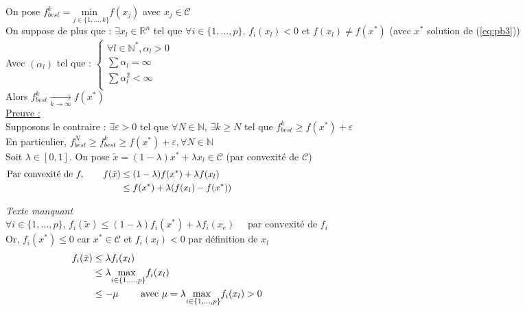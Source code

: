 \documentclass[12pt,a4paper]{article}
\begin{document}
On pose $f^k_{best} = \underset{j \in \{1, \dots, k\}}{\text{min }} f(x_j)$ avec $x_j \in \mathcal{C}$\\

On suppose de plus que : $\exists x_l \in \mathbb{R}^n$ tel que $\forall i \in \{1, \dots, p\}$, $f_i(x_l) < 0$ et $f(x_l) \neq f(x^*)$ (avec $x^*$ solution de (\ref{eq:pb3}))\\

Avec $(\alpha_l)$ tel que :
$
\begin{cases}
    \forall l \in \mathbb{N}^*, \alpha_l > 0\\
    \sum \alpha_l = \infty\\
    \sum \alpha_l^2 < \infty\\
\end{cases}
$\\

Alors $f^k_{best} \xrightarrow[k \rightarrow \infty]{} f(x^*)$\\

\noindent\underline{Preuve :}\\
Supposons le contraire : $\exists \varepsilon > 0$ tel que $\forall N \in \mathbb{N}$, $\exists k \geq N$ tel que $f^k_{best} \geq f(x^*) + \varepsilon$\\
En particulier, $f^N_{best} \geq f^k_{best} \geq f(x^*) + \varepsilon, \forall N \in \mathbb{N}$\\

Soit $\lambda \in [0, 1]$. On pose $\tilde{x} = (1 - \lambda) x^* + \lambda x_l \in \mathcal{C}$ (par convexité de $\mathcal{C}$)
\begin{align*}
    \text{Par convexité de } f, \qquad f(\tilde{x}) &\leq (1 - \lambda) f(x^*) + \lambda f(x_l) \hspace{14.5cm}\\
    &\leq f(x^*) + \lambda (f(x_l) - f(x^*))\\
\end{align*}

\textit{Texte manquant}\\


$\forall i \in \{1, \dots, p\}$, $f_i(\tilde{x}) \leq (1 - \lambda) f_i(x^*) + \lambda f_i(x_e) \quad \text{ par convexité de } f_i$\\
Or, $f_i(x^*) \leq 0$ car $x^* \in \mathcal{C}$ et $f_i(x_l) < 0$ par définition de $x_l$\\

\begin{align*}
    f_i(\tilde{x}) &\leq \lambda f_i(x_l) \hspace{14.5cm}\\
    &\leq \lambda \underset{i \in \{1, \dots, p\}}{\text{max }} f_i(x_l)\\
    &\leq - \mu \qquad \text{ avec } \mu = \lambda \underset{i \in \{1, \dots, p\}}{\text{max }} f_i(x_l) > 0\\
\end{align*}
\end{document}
